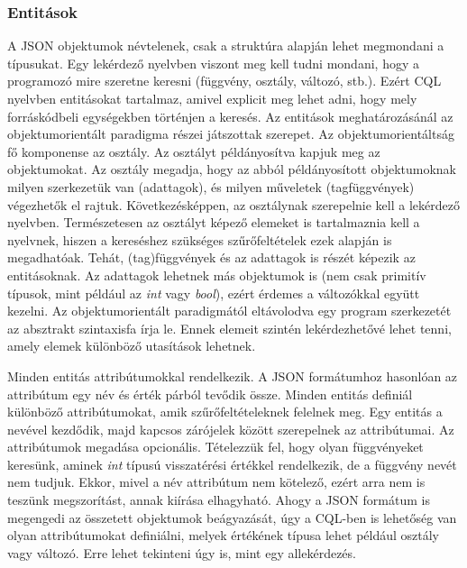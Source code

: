 \documentclass[a4paper,12pt]{report}
\begin{document}
\subsubsection{Entitások}
A JSON objektumok névtelenek, csak a struktúra alapján lehet megmondani a típusukat. Egy lekérdező nyelvben viszont meg kell tudni mondani, hogy a programozó mire szeretne keresni (függvény, osztály, változó, stb.). Ezért CQL nyelvben entitásokat tartalmaz, amivel explicit meg lehet adni, hogy mely forráskódbeli egységekben történjen a keresés. Az entitások meghatározásánál az objektumorientált paradigma részei játszottak szerepet. Az objektumorientáltság fő komponense az osztály. Az osztályt példányosítva kapjuk meg az objektumokat. Az osztály megadja, hogy az abból példányosított objektumoknak milyen szerkezetük van (adattagok), és milyen műveletek (tagfüggvények) végezhetők el rajtuk. Következésképpen, az osztálynak szerepelnie kell a lekérdező nyelvben. Természetesen az osztályt képező elemeket is tartalmaznia kell a nyelvnek, hiszen a kereséshez szükséges szűrőfeltételek ezek alapján is megadhatóak. Tehát, (tag)függvények és az adattagok is részét képezik az entitásoknak. Az adattagok lehetnek más objektumok is (nem csak primitív típusok, mint például az \textit{int} vagy \textit{bool}), ezért érdemes a változókkal együtt kezelni. Az objektumorientált paradigmától eltávolodva egy program szerkezetét az absztrakt szintaxisfa írja le. Ennek elemeit szintén lekérdezhetővé lehet tenni, amely elemek különböző utasítások lehetnek.
\par Minden entitás attribútumokkal rendelkezik. A JSON formátumhoz hasonlóan az attribútum egy név és érték párból tevődik össze. Minden entitás definiál különböző attribútumokat, amik szűrőfeltételeknek felelnek meg. Egy entitás a nevével kezdődik, majd kapcsos zárójelek között szerepelnek az attribútumai. Az attribútumok megadása opcionális. Tételezzük fel, hogy olyan függvényeket keresünk, aminek \textit{int} típusú visszatérési értékkel rendelkezik, de a függvény nevét nem tudjuk. Ekkor, mivel a név attribútum nem kötelező, ezért arra nem is teszünk megszorítást, annak kiírása elhagyható. Ahogy a JSON formátum is megengedi az összetett objektumok beágyazását, úgy a CQL-ben is lehetőség van olyan attribútumokat definiálni, melyek értékének típusa lehet például osztály vagy változó. Erre lehet tekinteni úgy is, mint egy allekérdezés. 
\end{document}
